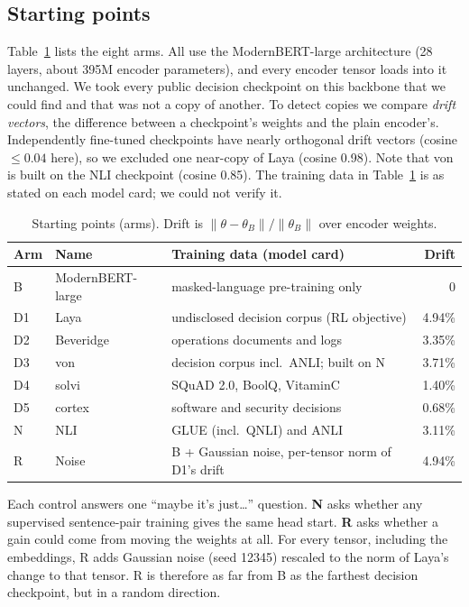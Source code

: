 \documentclass[journal]{IEEEtran}
\begin{document}
\subsection{Starting points}

Table~\ref{tab:arms} lists the eight arms. All use the ModernBERT-large architecture (28 layers, about 395M encoder parameters), and every encoder tensor loads into it unchanged. We took every public decision checkpoint on this backbone that we could find and that was not a copy of another. To detect copies we compare \emph{drift vectors}, the difference between a checkpoint's weights and the plain encoder's. Independently fine-tuned checkpoints have nearly orthogonal drift vectors (cosine $\leq0.04$ here), so we excluded one near-copy of Laya (cosine 0.98). Note that von is built on the NLI checkpoint (cosine 0.85). The training data in Table~\ref{tab:arms} is as stated on each model card; we could not verify it.

\begin{table}[t]
\centering
\caption{Starting points (arms). Drift is $\lVert\theta-\theta_B\rVert/\lVert\theta_B\rVert$ over encoder weights.}
\label{tab:arms}
\setlength{\tabcolsep}{3pt}
\begin{tabular}{@{}l l p{3.45cm} r@{}}
\toprule
Arm & Name & Training data (model card) & Drift \\
\midrule
B  & ModernBERT-large & masked-language pre-training only & 0 \\
D1 & Laya & undisclosed decision corpus (RL objective) & 4.94\% \\
D2 & Beveridge & operations documents and logs & 3.35\% \\
D3 & von & decision corpus incl.\ ANLI; built on N & 3.71\% \\
D4 & solvi & SQuAD 2.0, BoolQ, VitaminC & 1.40\% \\
D5 & cortex & software and security decisions & 0.68\% \\
\midrule
N  & NLI & GLUE (incl.\ QNLI) and ANLI~\cite{sileo2024tasksource} & 3.11\% \\
R  & Noise & B + Gaussian noise, per-tensor norm of D1's drift & 4.94\% \\
\bottomrule
\end{tabular}
\end{table}

Each control answers one ``maybe it's just\ldots'' question. \textbf{N} asks whether any supervised sentence-pair training gives the same head start. \textbf{R} asks whether a gain could come from moving the weights at all. For every tensor, including the embeddings, R adds Gaussian noise (seed 12345) rescaled to the norm of Laya's change to that tensor. R is therefore as far from B as the farthest decision checkpoint, but in a random direction.
\end{document}
